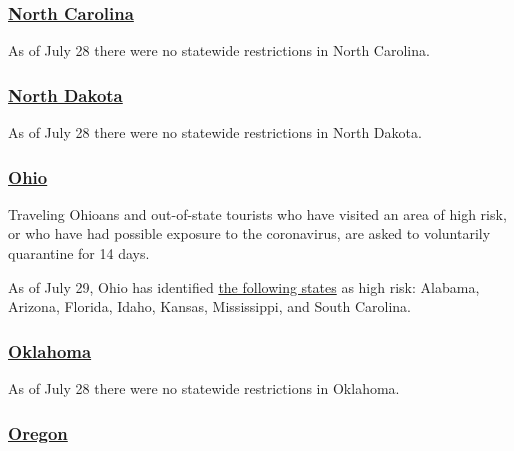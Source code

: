 \hypertarget{north-carolina}{%
\subsubsection{\texorpdfstring{\href{https://www.nc.gov/covid-19/covid-19-travel-resources}{North
Carolina}}{North Carolina}}\label{north-carolina}}

As of July 28 there were no statewide restrictions in North Carolina.

\hypertarget{north-dakota}{%
\subsubsection{\texorpdfstring{\href{https://www.health.nd.gov/diseases-conditions/coronavirus/travel}{North
Dakota}}{North Dakota}}\label{north-dakota}}

As of July 28 there were no statewide restrictions in North Dakota.

\hypertarget{ohio}{%
\subsubsection{\texorpdfstring{\href{https://coronavirus.ohio.gov/wps/portal/gov/covid-19/home}{Ohio}}{Ohio}}\label{ohio}}

Traveling Ohioans and out-of-state tourists who have visited an area of
high risk, or who have had possible exposure to the coronavirus, are
asked to voluntarily quarantine for 14 days.

As of July 29, Ohio has identified
\href{https://coronavirus.ohio.gov/wps/portal/gov/covid-19/families-and-individuals/COVID-19-Travel-Advisory/COVID-19-Travel-Advisory}{the
following states} as high risk: Alabama, Arizona, Florida, Idaho,
Kansas, Mississippi, and South Carolina.

\hypertarget{oklahoma}{%
\subsubsection{\texorpdfstring{\href{https://coronavirus.health.ok.gov/travel}{Oklahoma}}{Oklahoma}}\label{oklahoma}}

As of July 28 there were no statewide restrictions in Oklahoma.

\hypertarget{oregon}{%
\subsubsection{\texorpdfstring{\href{https://traveloregon.com/travel-alerts/}{Oregon}}{Oregon}}\label{oregon}}

